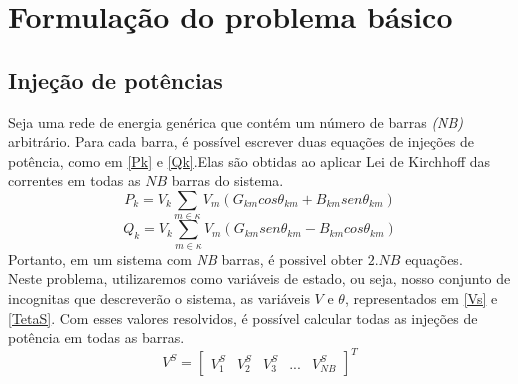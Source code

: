 \section{Formula\c{c}\~ao do problema b\'asico}
\label{SectionFormula}
\subsection{Injeção de potências}

Seja uma rede de energia gen\'erica que cont\'em um n\'umero de barras \textit{(NB)} arbitr\'ario. Para cada barra, \'e poss\'ivel escrever duas equa\c{c}\~oes de inje\c{c}\~oes de pot\^encia, como em \ref{Pk} e \ref{Qk}.Elas são obtidas ao aplicar Lei de Kirchhoff das correntes em todas as $NB$ barras do sistema.\\
\begin{equation}
    P_k = V_k \sum_{m\in \kappa} V_m (G_{km} cos\theta_{km} + B_{km}sen\theta_{km})
    \label{Pk}
\end{equation}
\begin{equation}
    Q_k = V_k \sum_{m\in \kappa} V_m (G_{km} sen\theta_{km} - B_{km}cos\theta_{km})
    \label{Qk}
\end{equation}
Portanto, em um sistema com \textit{NB} barras, \'e possivel obter $2.NB$ equa\c{c}\~oes.\\
Neste problema, utilizaremos como variáveis de estado, ou seja, nosso conjunto de incognitas que descreverão o sistema, as variáveis $V$ e $\theta$, representados em \ref{Vs} e \ref{TetaS}. Com esses valores resolvidos, \'e possível calcular todas as injeções de potência em todas as barras.\\
\begin{equation}
    V^S  = \left[ \begin{matrix} V_1^S & V_2^S & V_3^S & ... & V_{NB}^S  \end{matrix} \right]^T 
    \label{Vs}
\end{equation}

